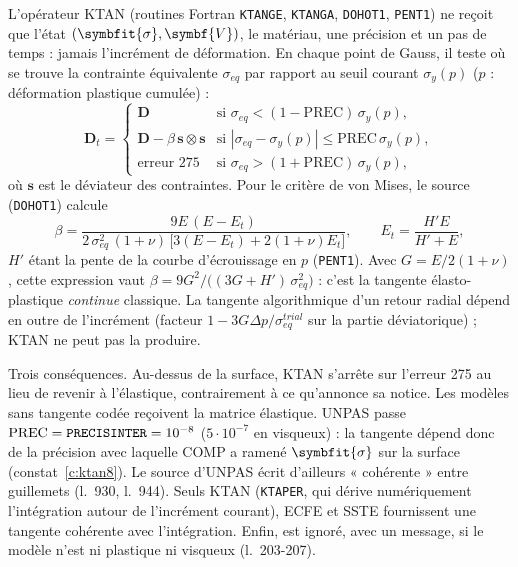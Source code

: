\documentclass[11pt,a4paper]{article}
\numberwithin{equation}{section}
\newcommand{\src}[1]{\texttt{\detokenize{#1}}}          %
\newcommand{\pr}[1]{\textsf{#1}}                        %
\newcommand{\op}[1]{\textsf{\small #1}}                 %
\newcommand{\lig}[1]{l.~#1}
\newcommand{\vc}[1]{\symbf{#1}}                         %
\newcommand{\sig}{\symbfit{\sigma}}
\begin{document}
L'opérateur \op{KTAN} (routines Fortran \texttt{KTANGE}, \texttt{KTANGA}, \texttt{DOHOT1}, \texttt{PENT1}) ne reçoit que l'état $(\sig, \vc V)$, le matériau, une précision \src{PREC} et un pas de temps : jamais l'incrément de déformation.
En chaque point de Gauss, il teste où se trouve la contrainte équivalente $\sigma_{eq}$ par rapport au seuil courant $\sigma_y(p)$ ($p$ : déformation plastique cumulée) :
\begin{equation}
\vc D_t =
\begin{cases}
\vc D & \text{si } \sigma_{eq} < (1 - \mathrm{PREC})\,\sigma_y(p),\\[2pt]
\vc D - \beta\,\vc s\otimes\vc s & \text{si } |\sigma_{eq} - \sigma_y(p)| \le \mathrm{PREC}\,\sigma_y(p),\\[2pt]
\text{erreur 275} & \text{si } \sigma_{eq} > (1 + \mathrm{PREC})\,\sigma_y(p),
\end{cases}
\end{equation}
où $\vc s$ est le déviateur des contraintes.
Pour le critère de von Mises, le source (\texttt{DOHOT1}) calcule
\begin{equation}
\beta = \frac{9E\,(E - E_t)}{2\,\sigma_{eq}^2\,(1+\nu)\,\big[3(E - E_t) + 2(1+\nu)E_t\big]},
\qquad E_t = \frac{H'E}{H' + E},
\end{equation}
$H'$ étant la pente de la courbe d'écrouissage en $p$ (\texttt{PENT1}).
Avec $G = E/2(1+\nu)$, cette expression vaut $\beta = 9G^2/\big((3G + H')\,\sigma_{eq}^2\big)$ : c'est la tangente élasto-plastique \emph{continue} classique.
La tangente algorithmique d'un retour radial dépend en outre de l'incrément (facteur $1 - 3G\Delta p/\sigma_{eq}^{trial}$ sur la partie déviatorique) ; \op{KTAN} ne peut pas la produire.

Trois conséquences.
Au-dessus de la surface, \op{KTAN} s'arrête sur l'erreur 275 au lieu de revenir à l'élastique, contrairement à ce qu'annonce sa notice.
Les modèles sans tangente codée reçoivent la matrice élastique.
UNPAS passe $\mathrm{PREC} = \src{PRECISINTER} = 10^{-8}$ ($5\cdot10^{-7}$ en visqueux) : la tangente dépend donc de la précision avec laquelle \op{COMP} a ramené $\sig$ sur la surface (constat~\ref{c:ktan8}).
Le source d'\pr{UNPAS} écrit d'ailleurs « cohérente » entre guillemets (\lig{930}, \lig{944}).
Seuls \op{KTAN} \src{PERT} (\texttt{KTAPER}, qui dérive numériquement l'intégration autour de l'incrément courant), \op{ECFE} et \op{SSTE} fournissent une tangente cohérente avec l'intégration.
Enfin, \src{K_TANGENT} est ignoré, avec un message, si le modèle n'est ni plastique ni visqueux (\lig{203-207}).
\end{document}
